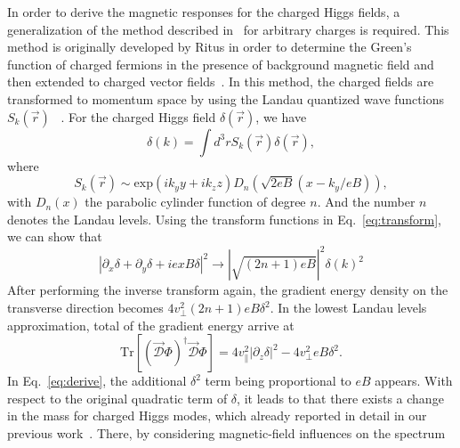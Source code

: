 \documentclass[12pt]{article}
\begin{document}
In order to derive the magnetic responses for the charged Higgs fields, 
a generalization of the method described in~\cite{Ritus1985Quantum} for arbitrary
charges is required.
This method is originally developed
by Ritus in order to determine the Green’s function
of charged fermions in the presence of background magnetic field and then  extended to charged vector fields~\cite{Elizalde2004Neutrino}.
In this method, the charged fields are transformed  to momentum space by using the Landau
quantized wave functions $S_k(\vec{r})$ ~\cite{ferrer2007magnetic,Elizalde2004Neutrino}.
For the charged Higgs field $\delta(\vec{r})$, we have
\begin{equation}
\label{eq:transform}
\delta(k) = \int d^3r S_k(\vec{r})\delta(\vec{r}),
\end{equation}
where
\begin{equation}
  S_k(\vec{r}) \sim \text{exp}(ik_y y + ik_z z)D_n(\sqrt{2eB}(x - k_y/eB)),
\end{equation}
with $D_n(x)$ the parabolic cylinder function of degree $n$. And the number $n$ denotes the Landau levels.
Using the transform functions in Eq.~\eqref{eq:transform}, we can show that
\begin{equation}
  |\partial_x \delta + \partial_y \delta + ie xB\delta|^2 \rightarrow
   |   \sqrt{(2n+1) eB} |^2 \delta(k)^2
\end{equation}
After performing the inverse transform again,
 the gradient energy density on the transverse direction becomes $4 v_\perp^2(2n+1) eB\delta^2$.
In the lowest Landau levels approximation, total of the gradient energy arrive at 
 \begin{equation}
\label{eq:derive}
\text{Tr}\left[(\vec{\mathcal{D}}\Phi)^\dagger\vec{\mathcal{D}}\Phi \right] = 
4 v_\parallel^2|\partial_z \delta|^2
- 4 v_\perp^2 eB\delta^2.
\end{equation}
In Eq.~\eqref{eq:derive}, the additional $\delta^2$ term being proportional to $eB$ appears.
With respect to the original quadratic term of $\delta$, it
leads to that there exists a change in the mass for charged Higgs modes, which already reported
in detail in our previous work~\cite{zhang2015magnetic}.
There, by considering magnetic-field influences on the spectrum
\end{document}
